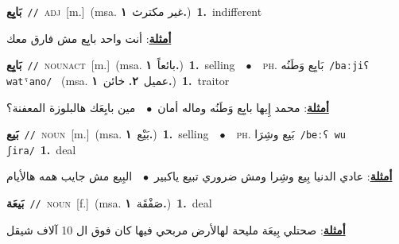\documentclass[10pt,a4paper,twoside]{article} %
\begin{document}
\begin{multicols}{2}
{\setlength\topsep{0pt}\textbf{\foreignlanguage{arabic}{بَايِع}}\ {\color{gray}\texttt{//}\color{black}}\ \textsc{adj}\ [m.]\ \color{gray}(msa. \foreignlanguage{arabic}{غير مكترث}~\foreignlanguage{arabic}{\textbf{١.}})\color{black}\ \textbf{1.}~indifferent\  \begin{flushright}\color{gray}\foreignlanguage{arabic}{\textbf{\underline{\foreignlanguage{arabic}{أمثلة}}}: أنت واحد بايِع مش فارق معك}\end{flushright}\color{black}} \vspace{2mm}

{\setlength\topsep{0pt}\textbf{\foreignlanguage{arabic}{بَايِع}}\ {\color{gray}\texttt{//}\color{black}}\ \textsc{noun\textunderscore act}\ [m.]\ \color{gray}(msa. \foreignlanguage{arabic}{بائعاً}~\foreignlanguage{arabic}{\textbf{١.}})\color{black}\ \textbf{1.}~selling\ \ $\bullet$\ \ \textsc{ph.} \color{gray} \foreignlanguage{arabic}{بَايِع وَطَنُه}\color{black}\ {\color{gray}\texttt{/{\sffamily baːjiʕ watˤano}/}\color{black}}\ \color{gray} (msa. \foreignlanguage{arabic}{عميل}~\foreignlanguage{arabic}{\textbf{٢.}}  \foreignlanguage{arabic}{خائن}~\foreignlanguage{arabic}{\textbf{١.}})\color{black}\ \textbf{1.}~traitor\  \begin{flushright}\color{gray}\foreignlanguage{arabic}{\textbf{\underline{\foreignlanguage{arabic}{أمثلة}}}: محمد إِيها بايِع وَطَنُه وماله أمان\ $\bullet$\ \  مين بايِعَك هالبلوزة المعفنة؟}\end{flushright}\color{black}} \vspace{2mm}

{\setlength\topsep{0pt}\textbf{\foreignlanguage{arabic}{بَيع}}\ {\color{gray}\texttt{//}\color{black}}\ \textsc{noun}\ [m.]\ \color{gray}(msa. \foreignlanguage{arabic}{بَيْع}~\foreignlanguage{arabic}{\textbf{١.}})\color{black}\ \textbf{1.}~selling\ \ $\bullet$\ \ \textsc{ph.} \color{gray} \foreignlanguage{arabic}{بَيع وشِرَا}\color{black}\ {\color{gray}\texttt{/{\sffamily beːʕ wu ʃira}/}\color{black}}\ \textbf{1.}~deal\  \begin{flushright}\color{gray}\foreignlanguage{arabic}{\textbf{\underline{\foreignlanguage{arabic}{أمثلة}}}: عادي الدنيا بِيع وشِرا ومش ضروري تبيع ياكبير\ $\bullet$\ \  البِيع مش جايب همه هالأيام}\end{flushright}\color{black}} \vspace{2mm}

{\setlength\topsep{0pt}\textbf{\foreignlanguage{arabic}{بَيعَة}}\ {\color{gray}\texttt{//}\color{black}}\ \textsc{noun}\ [f.]\ \color{gray}(msa. \foreignlanguage{arabic}{صَفْقَة}~\foreignlanguage{arabic}{\textbf{١.}})\color{black}\ \textbf{1.}~deal\  \begin{flushright}\color{gray}\foreignlanguage{arabic}{\textbf{\underline{\foreignlanguage{arabic}{أمثلة}}}: صحتلي بِيعَة مليحة لهالأرض مربحي فيها كان فوق ال 10 آلاف شيقل}\end{flushright}\color{black}} \vspace{2mm}


\end{multicols}
\end{document}
